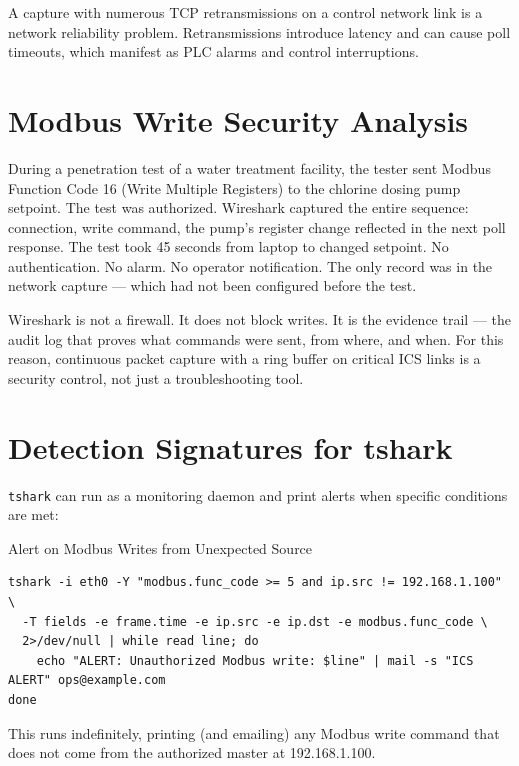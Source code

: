 \documentclass[12pt,twoside,openright]{memoir}
\begin{document}
A capture with numerous TCP retransmissions on a control network link is a network reliability problem. Retransmissions introduce latency and can cause poll timeouts, which manifest as PLC alarms and control interruptions.

\section{Modbus Write Security Analysis}

\begin{fieldnote}
During a penetration test of a water treatment facility, the tester sent Modbus Function Code 16 (Write Multiple Registers) to the chlorine dosing pump setpoint. The test was authorized. Wireshark captured the entire sequence: connection, write command, the pump's register change reflected in the next poll response. The test took 45 seconds from laptop to changed setpoint. No authentication. No alarm. No operator notification. The only record was in the network capture --- which had not been configured before the test.
\end{fieldnote}

Wireshark is not a firewall. It does not block writes. It is the evidence trail --- the audit log that proves what commands were sent, from where, and when. For this reason, continuous packet capture with a ring buffer on critical ICS links is a security control, not just a troubleshooting tool.

\section{Detection Signatures for tshark}

\texttt{tshark} can run as a monitoring daemon and print alerts when specific conditions are met:

\begin{example}{Alert on Modbus Writes from Unexpected Source}
\begin{lstlisting}
tshark -i eth0 -Y "modbus.func_code >= 5 and ip.src != 192.168.1.100" \
  -T fields -e frame.time -e ip.src -e ip.dst -e modbus.func_code \
  2>/dev/null | while read line; do
    echo "ALERT: Unauthorized Modbus write: $line" | mail -s "ICS ALERT" ops@example.com
done
\end{lstlisting}
This runs indefinitely, printing (and emailing) any Modbus write command that does not come from the authorized master at 192.168.1.100.
\end{example}
\end{document}
